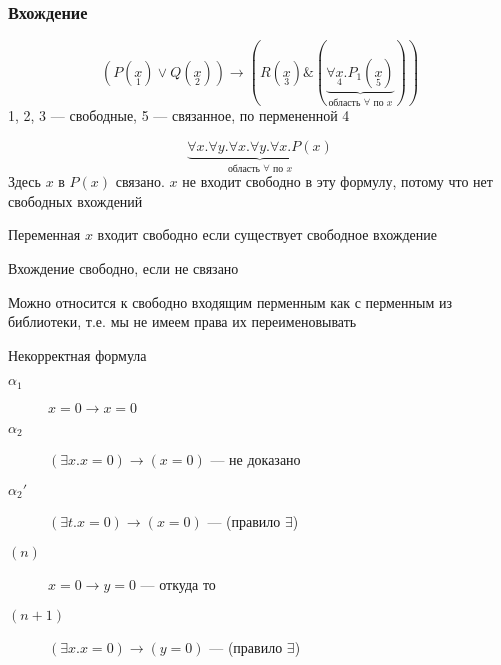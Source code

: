 \documentclass[english]{article}
\begin{document}
\subsubsection{Вхождение}
\label{sec:org9792819}
\begin{examp}
	\[ (P(\underset{1}{x}) \vee Q(\underset{2}{x})) \to (R(\underset{3}{x}) \& (\underbrace{\forall \underset{4}{x}. P_1(\underset{5}{x})}_{\text{область }\forall\text{ по }x})) \]
	1, 2, 3 --- свободные, 5 --- связанное, по пермененной 4
\end{examp}
\begin{examp}
	\[ \underbrace{\forall x. \forall y. \forall x. \forall y. \forall x. P(x)}_{\text{область }\forall\text{ по }x} \]
	Здесь \(x\) в \(P(x)\) связано. \(x\) не входит свободно в эту формулу, потому что нет свободных вхождений
\end{examp}
\begin{definition}
	Переменная \(x\) входит свободно если существует свободное вхождение
\end{definition}
\begin{definition}
	Вхождение свободно, если не связано
\end{definition}
Можно относится к свободно входящим перменным как с перменным из библиотеки, т.е. мы не имеем права их переименовывать
\begin{examp}
	Некорректная формула
	\begin{description}
		\item[{\(\alpha_1\)}] \(x = 0 \to x = 0\)
		\item[{\(\alpha_2\)}] \color{red}\((\exists x. x = 0) \to (x = 0)\) --- не доказано\color{black}
		\item[{\(\alpha_2'\)}] \((\exists t. x = 0) \to (x = 0)\) --- (правило \(\exists\))
	\end{description}
\end{examp}
\begin{examp}
	\-
	\begin{description}
		\item[{\((n)\)}] \(x = 0 \to y = 0\) --- откуда то
		\item[{\((n + 1)\)}] \((\exists x. x = 0) \to (y = 0)\) --- (правило \(\exists\))
	\end{description}
\end{examp}
\end{document}
